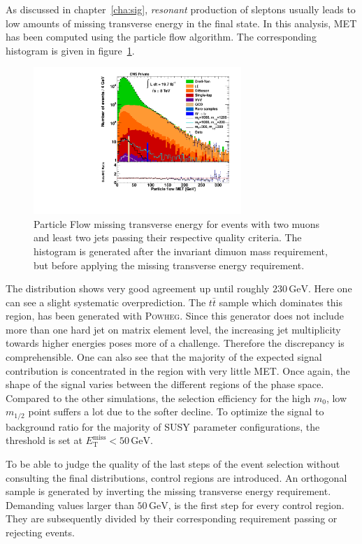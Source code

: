 As discussed in chapter~\ref{cha:sig}, \textit{resonant} production of sleptons usually leads to low amounts of missing transverse energy in the final state. In this analysis, MET has been computed using the particle flow algorithm. The corresponding histogram is given in figure~\ref{fig:pfmet}.

\begin{figure}[ht!]
  \centering
    \includegraphics[width=0.7\textwidth]{plots/pfmet.pdf}
  \caption{Particle Flow missing transverse energy for events with two muons and least two jets passing their respective quality criteria. The histogram is generated after the invariant dimuon mass requirement, but before applying the missing transverse energy requirement.}
  \label{fig:pfmet}
\end{figure}

The distribution shows very good agreement up until roughly $230\,\text{GeV}$. Here one can see a slight systematic overprediction. The $t\bar{t}$ sample which dominates this region, has been generated with \textsc{Powheg}. Since this generator does not include more than one hard jet on matrix element level, the increasing jet multiplicity towards higher energies poses more of a challenge. Therefore the discrepancy is comprehensible. One can also see that the majority of the expected signal contribution is concentrated in the region with very little MET. Once again, the shape of the signal varies between the different regions of the phase space. Compared to the other simulations, the selection efficiency for the high $m_0$, low $m_{1/2}$ point suffers a lot due to the softer decline. To optimize the signal to background ratio for the majority of SUSY parameter configurations, the threshold is set at $E^{\text{miss}}_{\text{T}} < 50\,\text{GeV}$.

To be able to judge the quality of the last steps of the event selection without consulting the final distributions, control regions are introduced. An orthogonal sample is generated by inverting the missing transverse energy requirement. Demanding values larger than $50\,\text{GeV}$, is the first step for every control region. They are subsequently divided by their corresponding requirement passing or rejecting events.


